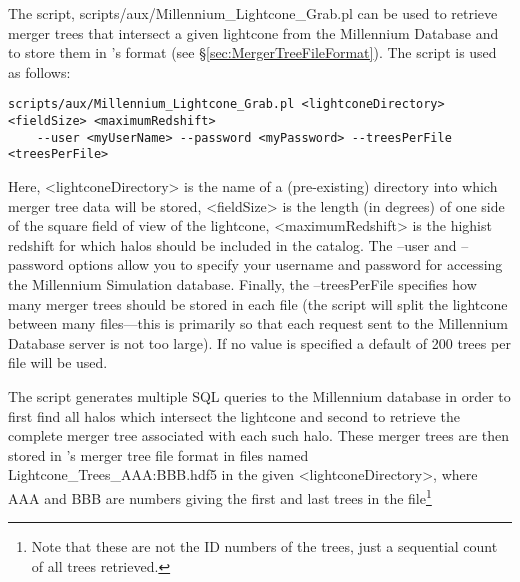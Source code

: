 The script, {\normalfont \ttfamily scripts/aux/Millennium\_Lightcone\_Grab.pl} can be used to retrieve merger trees that intersect a given lightcone from the Millennium Database and to store them in \glc's format (see \S\ref{sec:MergerTreeFileFormat}). The script is used as follows:
\begin{verbatim}
scripts/aux/Millennium_Lightcone_Grab.pl <lightconeDirectory> <fieldSize> <maximumRedshift>
    --user <myUserName> --password <myPassword> --treesPerFile <treesPerFile>
\end{verbatim}
Here, {\normalfont \ttfamily \textless lightconeDirectory\textgreater} is the name of a (pre-existing) directory into which merger tree data will be stored, {\normalfont \ttfamily \textless fieldSize\textgreater} is the length (in degrees) of one side of the square field of view of the lightcone, {\normalfont \ttfamily \textless maximumRedshift\textgreater} is the highist redshift for which halos should be included in the catalog. The {\normalfont \ttfamily --user} and {\normalfont \ttfamily --password} options allow you to specify your username and password for accessing the Millennium Simulation database. Finally, the {\normalfont \ttfamily --treesPerFile} specifies how many merger trees should be stored in each file (the script will split the lightcone between many files---this is primarily so that each request sent to the Millennium Database server is not too large). If no value is specified a default of 200 trees per file will be used.

The script generates multiple SQL queries to the Millennium database in order to first find all halos which intersect the lightcone and second to retrieve the complete merger tree associated with each such halo. These merger trees are then stored in \glc's merger tree file format in files named {\normalfont \ttfamily Lightcone\_Trees\_AAA:BBB.hdf5} in the given {\normalfont \ttfamily \textless lightconeDirectory\textgreater}, where {\normalfont \ttfamily AAA} and {\normalfont \ttfamily BBB} are numbers giving the first and last trees in the file\footnote{Note that these are not the ID numbers of the trees, just a sequential count of all trees retrieved.}


